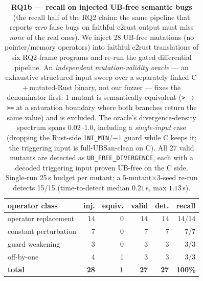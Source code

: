 \begin{table}[t]
  \centering
  \caption{\textbf{RQ1b --- recall on injected UB-free semantic bugs} (the recall half
    of the RQ2 claim: the same pipeline that reports \emph{zero} false bugs on faithful
    c2rust output must miss \emph{none} of the real ones). We inject 28 UB-free
    mutations (no pointer/memory operators) into faithful c2rust translations of six
    RQ2-frame programs and re-run the gated differential pipeline. An
    \emph{independent mutation-validity oracle} --- an exhaustive structured input
    sweep over a separately linked C\,+\,mutated-Rust binary, not our fuzzer ---
    fixes the denominator first: 1 mutant is semantically equivalent
    (\texttt{>}$\to$\texttt{>=} at a saturation boundary where both branches return
    the same value) and is excluded. The oracle's divergence-density spectrum spans
    $0.02$--$1.0$, including a \emph{single-input} case (dropping the Rust-side
    \texttt{INT\_MIN}/$-1$ guard while C keeps it; the triggering input is
    full-UBSan-clean on C). All 27 valid mutants are detected as
    \texttt{UB\_FREE\_DIVERGENCE}, each with a decoded triggering input proven UB-free
    on the C side. Single-run 25\,s budget per mutant; a 5-mutant$\times$3-seed
    re-run detects 15/15 (time-to-detect median $0.21$\,s, max $1.13$\,s).}
  \label{tab:rq1b-recall}
  \begin{tabular}{l r r r r r}
    \toprule
    operator class & inj. & equiv. & valid & det. & recall \\
    \midrule
    operator replacement   & 14 & 0 & 14 & 14 & 14/14 \\
    constant perturbation  &  7 & 0 &  7 &  7 & 7/7 \\
    guard weakening        &  3 & 0 &  3 &  3 & 3/3 \\
    off-by-one             &  4 & 1 &  3 &  3 & 3/3 \\
    \midrule
    \textbf{total} & \textbf{28} & \textbf{1} & \textbf{27} & \textbf{27} & \textbf{100\%} \\
    \bottomrule
  \end{tabular}
\end{table}

